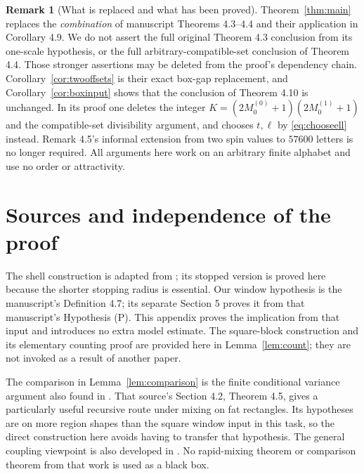 \documentclass[11pt]{amsart}
\theoremstyle{definition}
\newtheorem{remark}[theorem]{Remark}
\newcommand{\1}{\mathbf 1}
\begin{document}
\begin{remark}[What is replaced and what has been proved]
Theorem~\ref{thm:main} replaces the \emph{combination} of manuscript
Theorems 4.3--4.4 and their application in Corollary 4.9. We do not assert
the full original Theorem 4.3 conclusion from its one-scale hypothesis,
or the full arbitrary-compatible-set conclusion of Theorem 4.4.
Those stronger assertions may be deleted from the proof's dependency
chain. Corollary~\ref{cor:twooffsets} is their exact box-gap replacement,
and Corollary~\ref{cor:boxinput} shows that the conclusion of Theorem 4.10
is unchanged. In its proof one deletes the integer
$K=(2M_0^{(0)}+1)(2M_0^{(1)}+1)$ and the compatible-set divisibility
argument, and chooses $t,\ell$ by \eqref{eq:chooseell} instead.
Remark 4.5's informal extension from two spin values to $57600$ letters
is no longer required. All arguments here work on an arbitrary finite
alphabet and use no order or attractivity.
\end{remark}

\section{Sources and independence of the proof}
\label{sec:sources}

The shell construction is adapted from \cite[Section 2, proof of
Proposition 2.1, equations (2.4)--(2.12)]{MOS}; its stopped version is
proved here because the shorter stopping radius is essential.
Our window hypothesis is the manuscript's Definition 4.7; its separate
Section 5 proves it from that manuscript's Hypothesis (P). This appendix
proves the implication from that input and introduces no extra model
estimate.
The square-block construction and its elementary counting proof are
provided here in Lemma~\ref{lem:count}; they are not invoked as a result
of another paper.

The comparison in Lemma~\ref{lem:comparison} is the finite conditional
variance argument also found in \cite[Section 3.7, Proposition 3.4,
(3.29)--(3.32)]{Martinelli}. That source's Section 4.2, Theorem 4.5,
gives a particularly useful recursive route under mixing on fat
rectangles. Its hypotheses are on more region shapes than the square
window input in this task, so the direct construction here avoids having
to transfer that hypothesis.
The general coupling viewpoint is also developed in
\cite[Theorem 2.5 and Section 6]{DSVW}.
No rapid-mixing theorem or comparison theorem from that work is used as a
black box.
\end{document}

